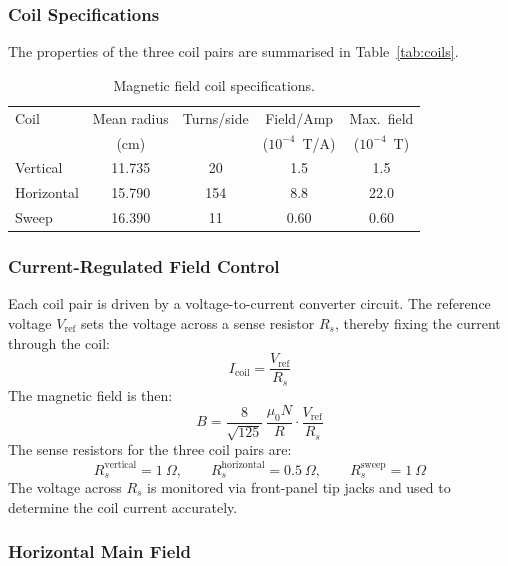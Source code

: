 \subsubsection*{Coil Specifications}
 
The properties of the three coil pairs are summarised in Table~\ref{tab:coils}.
 
\begin{table}[h]
    \centering
    \begin{tabular}{lcccc}
        \hline
        Coil & Mean radius & Turns/side & Field/Amp & Max.\ field \\
             & (cm)        &            & ($10^{-4}$~T/A) & ($10^{-4}$~T) \\
        \hline
        Vertical   & 11.735 & 20  & 1.5 & 1.5 \\
        Horizontal & 15.790 & 154 & 8.8 & 22.0 \\
        Sweep      & 16.390 & 11  & 0.60 & 0.60 \\
        \hline
    \end{tabular}
    \caption{Magnetic field coil specifications.}
\end{table}
 
\subsubsection*{Current-Regulated Field Control}
 
Each coil pair is driven by a voltage-to-current converter circuit. The reference
voltage $V_{\text{ref}}$ sets the voltage across a sense resistor $R_s$, thereby
fixing the current through the coil:
\begin{equation}
    I_{\text{coil}} = \frac{V_{\text{ref}}}{R_s}
\end{equation}
The magnetic field is then:
\begin{equation}
    B = \frac{8}{\sqrt{125}}\,\frac{\mu_0 N}{R} \cdot \frac{V_{\text{ref}}}{R_s}
\end{equation}
The sense resistors for the three coil pairs are:
\begin{equation}
    R_s^{\text{vertical}} = 1\ \Omega, \qquad
    R_s^{\text{horizontal}} = 0.5\ \Omega, \qquad
    R_s^{\text{sweep}} = 1\ \Omega
\end{equation}
The voltage across $R_s$ is monitored via front-panel tip jacks and used to determine
the coil current accurately.
 
\subsubsection*{Horizontal Main Field}
 

